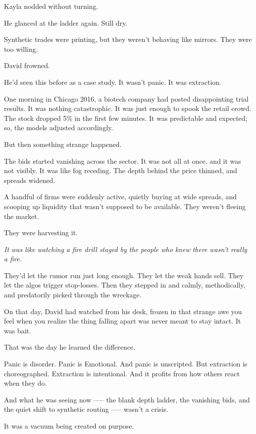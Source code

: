 \medskip


Kayla nodded without turning.

He glanced at the ladder again.
Still dry.

Synthetic trades were printing, but they weren’t behaving like mirrors. They were too willing.

David frowned.

He'd seen this before as a case study.
It wasn’t panic.
It was extraction.



One morning in Chicago 2016, a biotech company had posted disappointing trial results. 
It was nothing catastrophic. It was just enough to spook the 
retail crowd. The stock dropped 5\% in the first few minutes. It was predictable and expected; so, the models adjusted 
accordingly.

But then something strange happened.

The bids started vanishing across the sector. It was not all at once, and it was not visibly. It was like fog receding. 
The depth behind the price thinned, and spreads widened.

A handful of firms were suddenly active, quietly buying at wide spreads, 
and scooping up liquidity that wasn’t supposed to be available. They weren’t fleeing the market.

They were harvesting it.

\textit{It was like watching a fire drill staged by the people who knew there wasn’t really a fire.}

They’d let the rumor run just long enough. They let the weak hands sell. They let the algos trigger stop-losses.
Then they stepped in and calmly, methodically, and predatorily picked through the wreckage.

On that day, David had watched from his desk, frozen in that strange awe you feel when you realize the thing falling apart was never 
meant to stay intact. It was bait.

That was the day he learned the difference.

Panic is disorder. Panic is  Emotional. And panic is unscripted.
But extraction is choreographed. Extraction is intentional. And it
profits from how others react when they do.

And what he was seeing now --— the blank depth ladder, the vanishing bids, and the quiet shift to synthetic routing —-- 
wasn’t a crisis.

It was a vacuum being created on purpose.

